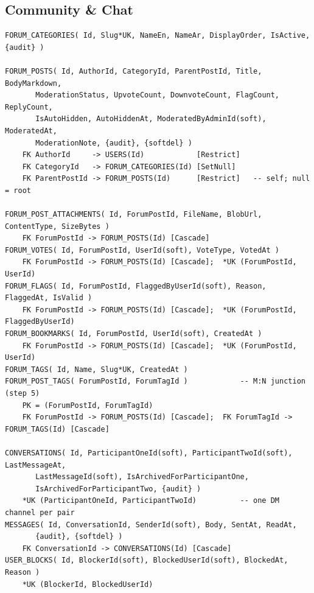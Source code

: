 \documentclass[11pt,a4paper]{article}
\begin{document}
\subsection{Community \& Chat}
{\footnotesize\begin{verbatim}
FORUM_CATEGORIES( Id, Slug*UK, NameEn, NameAr, DisplayOrder, IsActive, {audit} )

FORUM_POSTS( Id, AuthorId, CategoryId, ParentPostId, Title, BodyMarkdown,
       ModerationStatus, UpvoteCount, DownvoteCount, FlagCount, ReplyCount,
       IsAutoHidden, AutoHiddenAt, ModeratedByAdminId(soft), ModeratedAt,
       ModerationNote, {audit}, {softdel} )
    FK AuthorId     -> USERS(Id)            [Restrict]
    FK CategoryId   -> FORUM_CATEGORIES(Id) [SetNull]
    FK ParentPostId -> FORUM_POSTS(Id)      [Restrict]   -- self; null = root

FORUM_POST_ATTACHMENTS( Id, ForumPostId, FileName, BlobUrl, ContentType, SizeBytes )
    FK ForumPostId -> FORUM_POSTS(Id) [Cascade]
FORUM_VOTES( Id, ForumPostId, UserId(soft), VoteType, VotedAt )
    FK ForumPostId -> FORUM_POSTS(Id) [Cascade];  *UK (ForumPostId, UserId)
FORUM_FLAGS( Id, ForumPostId, FlaggedByUserId(soft), Reason, FlaggedAt, IsValid )
    FK ForumPostId -> FORUM_POSTS(Id) [Cascade];  *UK (ForumPostId, FlaggedByUserId)
FORUM_BOOKMARKS( Id, ForumPostId, UserId(soft), CreatedAt )
    FK ForumPostId -> FORUM_POSTS(Id) [Cascade];  *UK (ForumPostId, UserId)
FORUM_TAGS( Id, Name, Slug*UK, CreatedAt )
FORUM_POST_TAGS( ForumPostId, ForumTagId )            -- M:N junction (step 5)
    PK = (ForumPostId, ForumTagId)
    FK ForumPostId -> FORUM_POSTS(Id) [Cascade];  FK ForumTagId -> FORUM_TAGS(Id) [Cascade]

CONVERSATIONS( Id, ParticipantOneId(soft), ParticipantTwoId(soft), LastMessageAt,
       LastMessageId(soft), IsArchivedForParticipantOne,
       IsArchivedForParticipantTwo, {audit} )
    *UK (ParticipantOneId, ParticipantTwoId)          -- one DM channel per pair
MESSAGES( Id, ConversationId, SenderId(soft), Body, SentAt, ReadAt,
       {audit}, {softdel} )
    FK ConversationId -> CONVERSATIONS(Id) [Cascade]
USER_BLOCKS( Id, BlockerId(soft), BlockedUserId(soft), BlockedAt, Reason )
    *UK (BlockerId, BlockedUserId)
\end{verbatim}}
\end{document}
